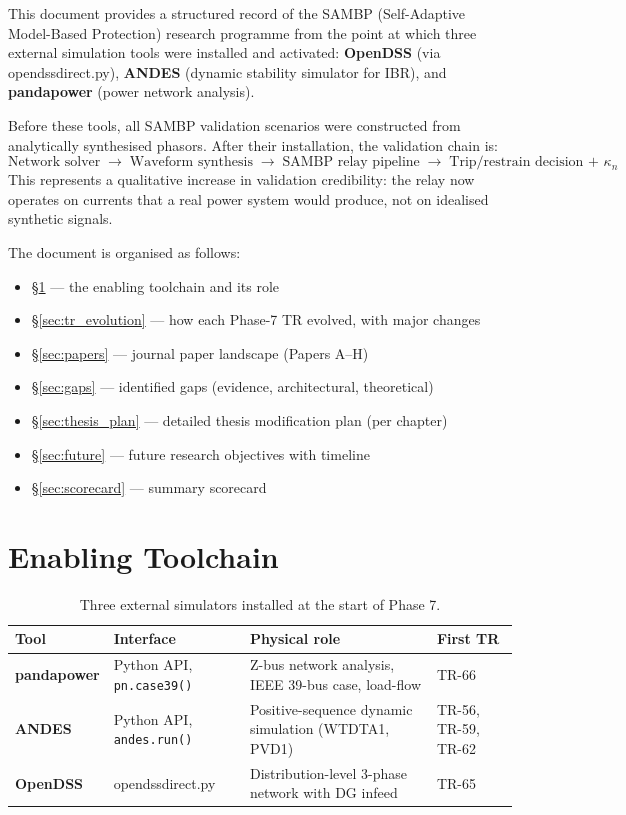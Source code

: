 \documentclass[12pt,a4paper]{article}
\newcommand{\kn}{\kappa_n}
\begin{document}
This document provides a structured record of the SAMBP (Self-Adaptive Model-Based
Protection) research programme from the point at which three external simulation
tools were installed and activated: \textbf{OpenDSS} (via opendssdirect.py),
\textbf{ANDES} (dynamic stability simulator for IBR), and \textbf{pandapower}
(power network analysis).

Before these tools, all SAMBP validation scenarios were constructed from
analytically synthesised phasors.  After their installation, the validation
chain is:
\[
  \text{Network solver} \;\longrightarrow\; \text{Waveform synthesis}
  \;\longrightarrow\; \text{SAMBP relay pipeline}
  \;\longrightarrow\; \text{Trip/restrain decision + } \kn
\]
This represents a qualitative increase in validation credibility: the relay
now operates on currents that a real power system would produce, not on
idealised synthetic signals.

The document is organised as follows:
\begin{itemize}
  \item \S\ref{sec:toolchain} — the enabling toolchain and its role
  \item \S\ref{sec:tr_evolution} — how each Phase-7 TR evolved, with major changes
  \item \S\ref{sec:papers} — journal paper landscape (Papers A--H)
  \item \S\ref{sec:gaps} — identified gaps (evidence, architectural, theoretical)
  \item \S\ref{sec:thesis_plan} — detailed thesis modification plan (per chapter)
  \item \S\ref{sec:future} — future research objectives with timeline
  \item \S\ref{sec:scorecard} — summary scorecard
\end{itemize}

\section{Enabling Toolchain}
\label{sec:toolchain}

\begin{table}[H]
\centering
\caption{Three external simulators installed at the start of Phase 7.}
\label{tab:tools}
\begin{tabular}{llll}
\toprule
Tool & Interface & Physical role & First TR \\
\midrule
\textbf{pandapower} & Python API, \texttt{pn.case39()} & Z-bus network analysis, IEEE 39-bus case, load-flow & TR-66 \\
\textbf{ANDES}      & Python API, \texttt{andes.run()} & Positive-sequence dynamic simulation (WTDTA1, PVD1) & TR-56, TR-59, TR-62 \\
\textbf{OpenDSS}    & opendssdirect.py & Distribution-level 3-phase network with DG infeed & TR-65 \\
\bottomrule
\end{tabular}
\end{table}
\end{document}
